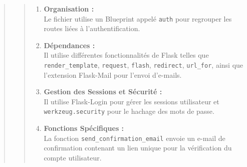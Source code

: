 \documentclass{article}
\begin{document}
\begin{quote}
\begin{quote}
\begin{enumerate}
        \item \textbf{Organisation :}\\
        Le fichier utilise un Blueprint appelé \texttt{auth} pour regrouper les routes liées à l'authentification.
    \vspace*{1\baselineskip}
        
        \item \textbf{Dépendances :}\\
        Il utilise différentes fonctionnalités de Flask telles que \texttt{render\_template}, \texttt{request}, \texttt{flash}, \texttt{redirect}, \texttt{url\_for}, ainsi que l'extension Flask-Mail pour l'envoi d'e-mails.
    \vspace*{1\baselineskip}
        
        \item \textbf{Gestion des Sessions et Sécurité :}\\
        Il utilise Flask-Login pour gérer les sessions utilisateur et \texttt{werkzeug.security} pour le hachage des mots de passe.
    \vspace*{1\baselineskip}
        
        \item \textbf{Fonctions Spécifiques :}\\
        La fonction \texttt{send\_confirmation\_email} envoie un e-mail de confirmation contenant un lien unique pour la vérification du compte utilisateur.
    \end{enumerate}
    \end{quote}

\end{quote}
\newpage
\end{document}
